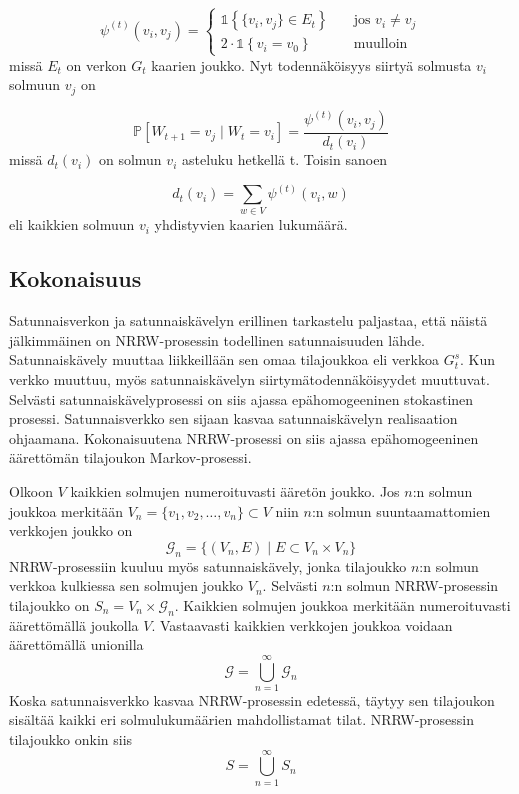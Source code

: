 \documentclass[finnish, 12pt, a4paper, sci, utf8, pdfa]{aaltothesis}
\newcommand{\indicator}{\mathopen{\mathds{1}}}
\newcommand*{\prob}{\mathbb{P}}
\begin{document}
\[
   \psi^{(t)}(v_{i}, v_{j}) = 
      \begin{cases}
         \indicator \left\{ \{ v_{i}, v_{j} \} \in E_{t} \right\} & \quad \text{jos } v_{i} \neq v_{j} \\
         2 \cdot \indicator \left\{ v_{i} = v_{0} \right\}        & \quad \text{muulloin}
      \end{cases}
   \label{equation:psi}
\]
missä \( E_{t} \) on verkon \( G_{t} \) kaarien joukko. Nyt todennäköisyys siirtyä solmusta \( v_{i} \) solmuun \( v_{j} \) on

\begin{equation}
   \prob \left[ W_{t+1} = v_{j} \mid W_{t} = v_{i} \right] = \frac{\psi^{(t)}(v_{i}, v_{j})}{d_{t}(v_{i})}
   \label{equation:verkko-tn}
\end{equation}
missä \( d_{t}(v_{i}) \) on solmun \( v_{i} \) asteluku hetkellä t. Toisin sanoen

\begin{equation}
   d_{t}(v_{i}) = \sum_{w \in V} \psi^{(t)}(v_{i}, w)
   \label{equation:asteluku}
\end{equation}
eli kaikkien solmuun \( v_{i} \) yhdistyvien kaarien lukumäärä.

\subsection{Kokonaisuus}

Satunnaisverkon ja satunnaiskävelyn erillinen tarkastelu paljastaa, että näistä jälkimmäinen on NRRW-prosessin todellinen satunnaisuuden lähde. Satunnaiskävely muuttaa liikkeillään sen omaa tilajoukkoa eli verkkoa \( G_{t}^{s} \). Kun verkko muuttuu, myös satunnaiskävelyn siirtymätodennäköisyydet muuttuvat. Selvästi satunnaiskävelyprosessi on siis ajassa epähomogeeninen stokastinen prosessi. Satunnaisverkko sen sijaan kasvaa satunnaiskävelyn realisaation ohjaamana. Kokonaisuutena NRRW-prosessi on siis ajassa epähomogeeninen äärettömän tilajoukon Markov-prosessi.

Olkoon $ V $ kaikkien solmujen numeroituvasti ääretön joukko. Jos $ n $:n solmun joukkoa merkitään $ V_{n} = \{ v_{1}, v_{2}, \ldots , v_{n} \} \subset V $ niin $ n $:n solmun suuntaamattomien verkkojen joukko on
\[
   \mathcal{G}_{n} = \{ (V_{n}, E) \mid E \subset V_{n} \times V_{n} \}
\]
NRRW-prosessiin kuuluu myös satunnaiskävely, jonka tilajoukko $ n $:n solmun verkkoa kulkiessa sen solmujen joukko $ V_{n} $. Selvästi $ n $:n solmun NRRW-prosessin tilajoukko on $ S_{n} = V_{n} \times \mathcal{G}_{n} $.
Kaikkien solmujen joukkoa merkitään numeroituvasti äärettömällä joukolla $ V $. Vastaavasti kaikkien verkkojen joukkoa voidaan äärettömällä unionilla
\begin{equation}
   \mathcal{G} = \bigcup_{n = 1}^{\infty} \mathcal{G}_{n}
\end{equation}
Koska satunnaisverkko kasvaa NRRW-prosessin edetessä, täytyy sen tilajoukon sisältää kaikki eri solmulukumäärien mahdollistamat tilat. NRRW-prosessin tilajoukko onkin siis
\begin{equation}
   S = \bigcup_{n = 1}^{\infty} S_{n}
\end{equation}
\end{document}
